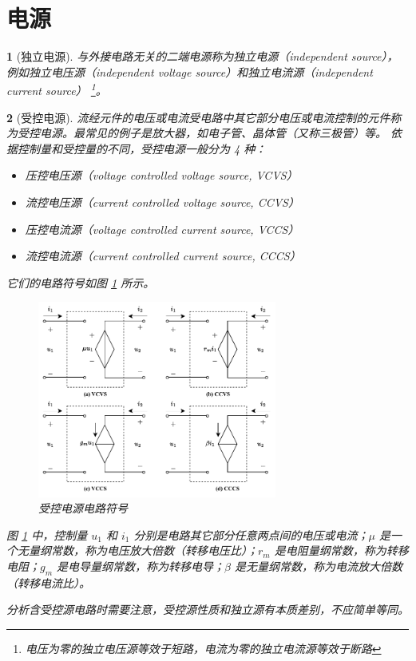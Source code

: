 \documentclass[UTF8]{report}
\theoremstyle{MyLineTheoremStyle} %
\theoremstyle{MyBlockTheoremStyle} %
\theoremstyle{MySubsubsectionStyle} %
\newtheorem{definition}{}
\begin{document}
\section{电源}


\begin{definition}[独立电源]
与外接电路无关的二端电源称为独立电源（independent source），例如独立电压源（independent voltage source）和独立电流源（independent current source）
\footnote{电压为零的独立电压源等效于短路，电流为零的独立电流源等效于断路}。
\end{definition}


\begin{definition}[受控电源]

流经元件的电压或电流受电路中其它部分电压或电流控制的元件称为受控电源。最常见的例子是放大器，如电子管、晶体管（又称三极管）等。
依据控制量和受控量的不同，受控电源一般分为 4 种：
\begin{itemize}
    \item 压控电压源（voltage controlled voltage source, VCVS）
    \item 流控电压源（current controlled voltage source, CCVS）
    \item 压控电流源（voltage controlled current source, VCCS）
    \item 流控电流源（current controlled current source, CCCS）
\end{itemize}
它们的电路符号如图 \ref{受控电源电路符号} 所示。 

\begin{figure}[H]\centering
\includegraphics[width=0.7\textwidth]{assets/1,2/受控电源电路符号.drawio.pdf}
\caption{受控电源电路符号}\label{受控电源电路符号}
\end{figure}

图 \ref{受控电源电路符号} 中，控制量 $u_1$ 和 $i_1$ 分别是电路其它部分任意两点间的电压或电流；$\mu$ 是一个无量纲常数，称为电压放大倍数（转移电压比）；$r_m$ 是电阻量纲常数，称为转移电阻；$g_m$ 是电导量纲常数，称为转移电导；$\beta$ 是无量纲常数，称为电流放大倍数（转移电流比）。

分析含受控源电路时需要注意，受控源性质和独立源有本质差别，不应简单等同。
\end{definition}
\end{document}
